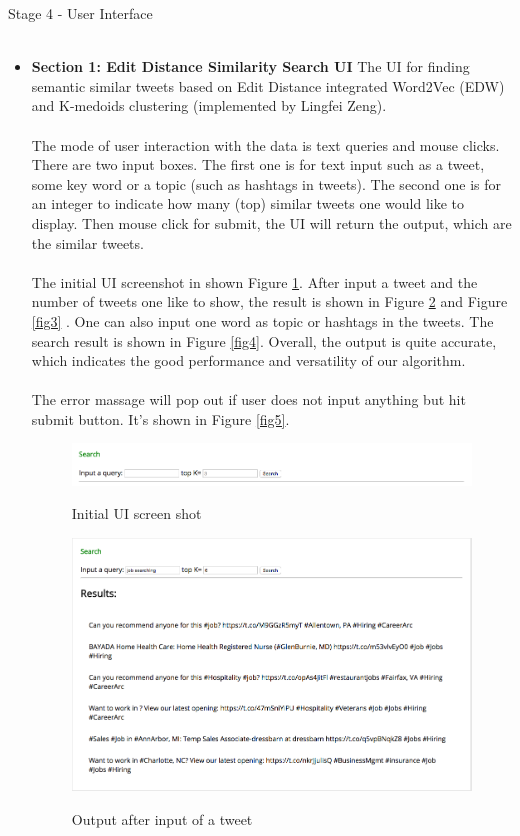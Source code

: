 \documentclass[10pt]{article}
\begin{document}
Stage 4 - User Interface \\\\
\begin{itemize} 

\item{\bf Section 1: Edit Distance Similarity Search UI} 
\textnormal{
The UI for finding semantic similar tweets based on Edit Distance integrated Word2Vec (EDW) and K-medoids clustering (implemented by Lingfei Zeng).\\\\
The mode of user interaction with the data is text queries and mouse clicks. There are two input boxes. The first one is for text input such as a tweet, some key word or a topic (such as hashtags in tweets). The second one is for an integer to indicate how many (top) similar tweets one would like to display. Then mouse click for submit, the UI will return the output, which are the similar tweets. \\\\
The initial UI screenshot in shown Figure \ref{fig1}. After input a tweet and the number of tweets one like to show, the result is shown in Figure \ref{fig2} and Figure \ref{fig3} . One can also input one word as topic or hashtags in the tweets. The search result is shown in  Figure \ref{fig4}. Overall, the output is quite accurate, which indicates the good performance and versatility of our algorithm. \\\\
The error massage will pop out if user does not input anything but hit submit button. It's shown in Figure \ref{fig5}.   
}

 
\begin{figure}[H]
	\caption{Initial UI screen shot}
	\centering
	\includegraphics[scale=0.3]{Screen_Shot_1.png}
	\label{fig1}
\end{figure}

\begin{figure}[h]
	\caption{Output after input of a tweet}
	\centering
	\includegraphics[scale=0.3]{Screen_Shot_2.png}
	\label{fig2}
\end{figure}


\end{itemize}
\end{document}
